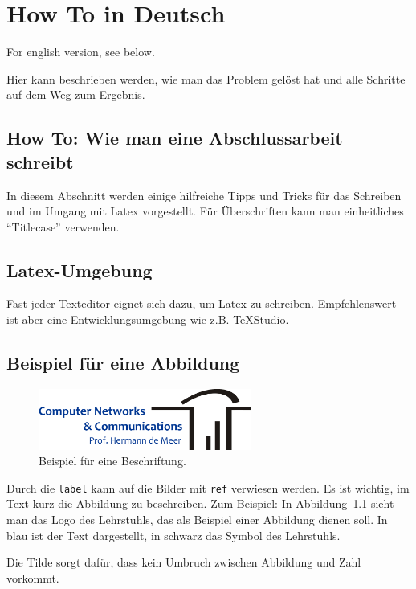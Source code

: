 \chapter{How To in Deutsch}
\label{sec:howtodeutsch}

For english version, see below.

Hier kann beschrieben werden, wie man das Problem gelöst hat und alle Schritte auf dem Weg zum Ergebnis.

\section{How To: Wie man eine Abschlussarbeit schreibt}
In diesem Abschnitt werden einige hilfreiche Tipps und Tricks für das Schreiben und im Umgang mit Latex vorgestellt.
Für Überschriften kann man einheitliches ``Titlecase'' verwenden.

\section{Latex-Umgebung}
Fast jeder Texteditor eignet sich dazu, um Latex zu schreiben. Empfehlenswert ist aber eine Entwicklungsumgebung wie z.B. TeXStudio.

\section{Beispiel für eine Abbildung}
\begin{figure}[h!]
	\begin{center}
		\includegraphics[width=7cm]{img/logochair.pdf}
		\caption{Beispiel für eine Beschriftung.}
		\label{fig:ToUseWithReference}
	\end{center}
\end{figure}

Durch die \texttt{\bslash label} kann auf die Bilder mit
\texttt{\bslash ref} verwiesen werden. Es ist wichtig, im Text kurz die Abbildung zu beschreiben. Zum Beispiel: In Abbildung~\ref{fig:ToUseWithReference} sieht man das Logo des Lehrstuhls, das als Beispiel einer Abbildung dienen soll. In blau ist der Text dargestellt, in schwarz das Symbol des Lehrstuhls.

Die Tilde sorgt dafür, dass kein Umbruch zwischen Abbildung und Zahl vorkommt.


